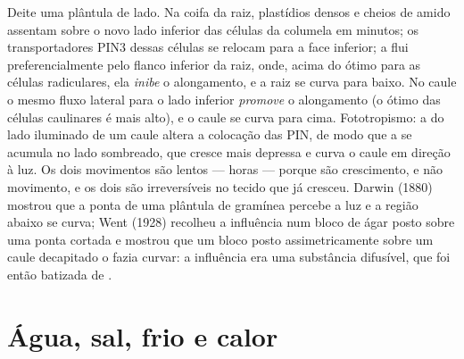 \begin{example}\label{ex:b3:plant-molecular-physiology:tropism}
Deite uma plântula de lado. Na coifa da raiz, plastídios densos e cheios
de amido assentam sobre o novo lado inferior das células da columela em
minutos; os transportadores PIN3 dessas células se relocam para a face
inferior; a  flui preferencialmente pelo flanco inferior da raiz,
onde, acima do ótimo para as células radiculares, ela \emph{inibe} o
alongamento, e a raiz se curva para baixo. No caule o mesmo fluxo lateral
para o lado inferior \emph{promove} o alongamento (o ótimo das células
caulinares é mais alto), e o caule se curva para cima. Fototropismo: a
 do lado iluminado de um caule altera a colocação das PIN, de
modo que a  se acumula no lado sombreado, que cresce mais depressa
e curva o caule em direção à luz. Os dois movimentos são lentos --- horas
--- porque são crescimento, e não movimento, e os dois são irreversíveis
no tecido que já cresceu. Darwin (1880) mostrou que a ponta de uma
plântula de gramínea percebe a luz e a região abaixo se curva; Went
(1928) recolheu a influência num bloco de ágar posto sobre uma ponta
cortada e mostrou que um bloco posto assimetricamente sobre um caule
decapitado o fazia curvar: a influência era uma substância difusível, que
foi então batizada de .
\end{example}

\section{Água, sal, frio e calor}

